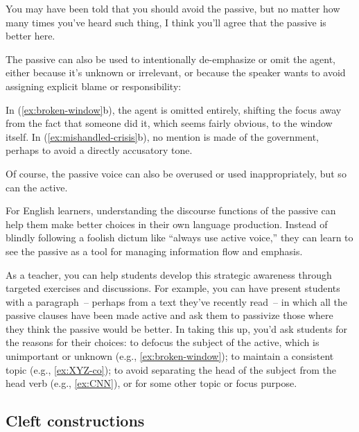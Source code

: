 You may have been told that you should avoid the passive, but no matter how many times you've heard such thing, I think you'll agree that the passive is better here.

The passive can also be used to intentionally de-emphasize or omit the agent, either because it's unknown or irrelevant, or because the speaker wants to avoid assigning explicit blame or responsibility:

\ea\label{ex:broken-window}
    \z
\ex\label{ex:mishandled-crisis}
    \z
\z

In (\ref{ex:broken-window}b), the agent is omitted entirely, shifting the focus away from the fact that someone did it, which seems fairly obvious, to the window itself. In (\ref{ex:mishandled-crisis}b), no mention is made of the government, perhaps to avoid a directly accusatory tone.

Of course, the passive voice can also be overused or used inappropriately, but so can the active.

For English learners, understanding the discourse functions of the passive can help them make better choices in their own language production. Instead of blindly following a foolish dictum like ``always use active voice,'' they can learn to see the passive as a tool for managing information flow and emphasis.

As a teacher, you can help students develop this strategic awareness through targeted exercises and discussions. For example, you can have present students with a paragraph~-- perhaps from a text they've recently read~-- in which all the passive clauses have been made active and ask them to passivize those where they think the passive would be better. In taking this up, you'd ask students for the reasons for their choices: to defocus the subject of the active, which is unimportant or unknown (e.g., \ref{ex:broken-window}); to maintain a consistent topic (e.g., \ref{ex:XYZ-co}); to avoid separating the head of the subject from the head verb (e.g., \ref{ex:CNN}), or for some other topic or focus purpose.

\subsection{Cleft constructions} \label{sec:clefts}

